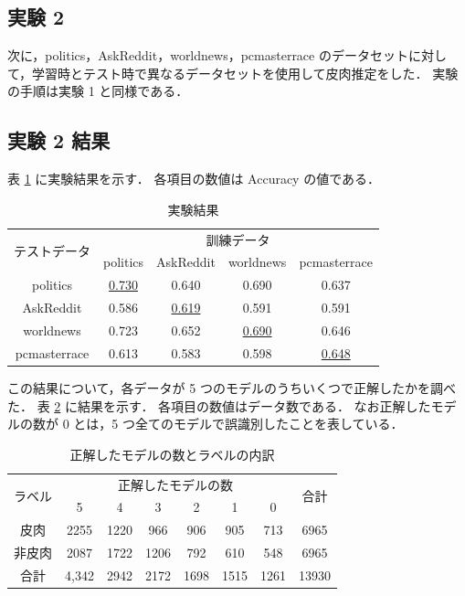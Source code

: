 \subsection{実験 2}

次に，politics，AskReddit，worldnews，pcmasterrace のデータセットに対して，学習時とテスト時で異なるデータセットを使用して皮肉推定をした．
実験の手順は実験 1 と同様である．


\afterpage{\clearpage}
\subsection{実験 2 結果}
表 \ref{tb:4_result2} に実験結果を示す．
各項目の数値は Accuracy の値である．


\begin{table}[b]
  \caption{実験結果}
  \label{tb:4_result2}
  \centering
  \begin{tabular}{c c c c c} \hline

\multirow{2}{*}{テストデータ} & \multicolumn{4}{c}{訓練データ} \\ \cline{2-5}
 & politics & AskReddit & worldnews & pcmasterrace \\ \hline
politics & \underline{0.730} & 0.640 & 0.690 & 0.637 \\
AskReddit & 0.586 & \underline{0.619} & 0.591 & 0.591 \\
worldnews & 0.723 & 0.652 & \underline{0.690} & 0.646 \\
pcmasterrace & 0.613 & 0.583 & 0.598 & \underline{0.648} \\ \hline

  \end{tabular}
\end{table}



この結果について，各データが 5 つのモデルのうちいくつで正解したかを調べた．
表 \ref{tb:4_result3} に結果を示す．
各項目の数値はデータ数である．
なお正解したモデルの数が 0 とは，5 つ全てのモデルで誤識別したことを表している．

\begin{table}[tb]
  \caption{正解したモデルの数とラベルの内訳}
  \label{tb:4_result3}
  \centering
  \begin{tabular}{c c c c c c c c} \hline

\multirow{2}{*}{ラベル} & \multicolumn{6}{c}{正解したモデルの数} & \multirow{2}{*}{合計} \\ \cline{2-7}
 & 5 & 4 & 3 & 2 & 1 & 0 & \\ \hline
皮肉 & 2255 & 1220 & 966 & 906 & 905 & 713 & 6965 \\
非皮肉 & 2087 & 1722 & 1206 & 792 & 610 & 548 & 6965 \\ \hline
合計 & 4,342 & 2942 & 2172 & 1698 & 1515 & 1261 & 13930 \\ \hline

  \end{tabular}
\end{table}


